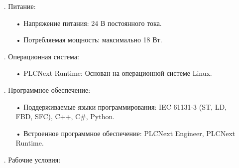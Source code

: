 {\begin{itemize}[leftmargin=2.15cm, labelwidth=0.65cm, labelsep=0.0cm]
\begin{itemize}[leftmargin=1.5cm, labelwidth=0.65cm, labelsep=0.0cm]
		\end{itemize}
		
		\addtocounter{itemcntr}{1}
		
		\item[\theitemcntr. ] Питание:
		
			\begin{itemize}[leftmargin=1.5cm, labelwidth=0.65cm, labelsep=0.0cm] 
			
			\item[•] Напряжение питания: 24 В постоянного тока.
			
			\item[•] Потребляемая мощность: максимально 18 Вт.
			
		    \end{itemize}
		    
		\addtocounter{itemcntr}{1}
		    
		\item[\theitemcntr. ] Операционная система:
		
		\begin{itemize}[leftmargin=1.5cm, labelwidth=0.65cm, labelsep=0.0cm] 
			
			\item[•] PLCNext Runtime: Основан на операционной системе Linux.
			
		\end{itemize}
		
		\addtocounter{itemcntr}{1}
		
		\item[\theitemcntr. ] Программное обеспечение:
		
		\begin{itemize}[leftmargin=1.5cm, labelwidth=0.65cm, labelsep=0.0cm] 
			
			\item[•] Поддерживаемые языки программирования: IEC 61131-3 (ST, LD, FBD, SFC), C++, C\#, Python.
			
			\item[•] Встроенное программное обеспечение: PLCNext Engineer, PLCNext Runtime.
			
		\end{itemize}
		
		\addtocounter{itemcntr}{1}
		
		\item[\theitemcntr. ] Рабочие условия:
		
		\begin{itemize}[leftmargin=1.5cm, labelwidth=0.65cm, labelsep=0.0cm] 
			

\end{itemize}
\end{itemize}}
